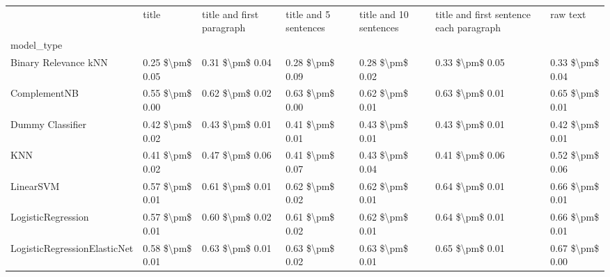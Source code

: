 \begin{tabular}{lllllll}
\toprule
{} &            title & title and first paragraph & title and 5 sentences & title and 10 sentences & title and first sentence each paragraph &             raw text \\
model\_type                      &                  &                           &                       &                        &                                         &                      \\
\midrule
Binary Relevance kNN            &  0.25 \$\textbackslash pm\$ 0.05 &           0.31 \$\textbackslash pm\$ 0.04 &       0.28 \$\textbackslash pm\$ 0.09 &        0.28 \$\textbackslash pm\$ 0.02 &                         0.33 \$\textbackslash pm\$ 0.05 &      0.33 \$\textbackslash pm\$ 0.04 \\
ComplementNB                    &  0.55 \$\textbackslash pm\$ 0.00 &           0.62 \$\textbackslash pm\$ 0.02 &       0.63 \$\textbackslash pm\$ 0.00 &        0.62 \$\textbackslash pm\$ 0.01 &                         0.63 \$\textbackslash pm\$ 0.01 &      0.65 \$\textbackslash pm\$ 0.01 \\
Dummy Classifier                &  0.42 \$\textbackslash pm\$ 0.02 &           0.43 \$\textbackslash pm\$ 0.01 &       0.41 \$\textbackslash pm\$ 0.01 &        0.43 \$\textbackslash pm\$ 0.01 &                         0.43 \$\textbackslash pm\$ 0.01 &      0.42 \$\textbackslash pm\$ 0.01 \\
KNN                             &  0.41 \$\textbackslash pm\$ 0.02 &           0.47 \$\textbackslash pm\$ 0.06 &       0.41 \$\textbackslash pm\$ 0.07 &        0.43 \$\textbackslash pm\$ 0.04 &                         0.41 \$\textbackslash pm\$ 0.06 &      0.52 \$\textbackslash pm\$ 0.06 \\
LinearSVM                       &  0.57 \$\textbackslash pm\$ 0.01 &           0.61 \$\textbackslash pm\$ 0.01 &       0.62 \$\textbackslash pm\$ 0.02 &        0.62 \$\textbackslash pm\$ 0.01 &                         0.64 \$\textbackslash pm\$ 0.01 &      0.66 \$\textbackslash pm\$ 0.01 \\
LogisticRegression              &  0.57 \$\textbackslash pm\$ 0.01 &           0.60 \$\textbackslash pm\$ 0.02 &       0.61 \$\textbackslash pm\$ 0.02 &        0.62 \$\textbackslash pm\$ 0.01 &                         0.64 \$\textbackslash pm\$ 0.01 &      0.66 \$\textbackslash pm\$ 0.01 \\
LogisticRegressionElasticNet    &  0.58 \$\textbackslash pm\$ 0.01 &           0.63 \$\textbackslash pm\$ 0.01 &       0.63 \$\textbackslash pm\$ 0.02 &        0.63 \$\textbackslash pm\$ 0.01 &                         0.65 \$\textbackslash pm\$ 0.01 &      0.67 \$\textbackslash pm\$ 0.00 \\

\end{tabular}
